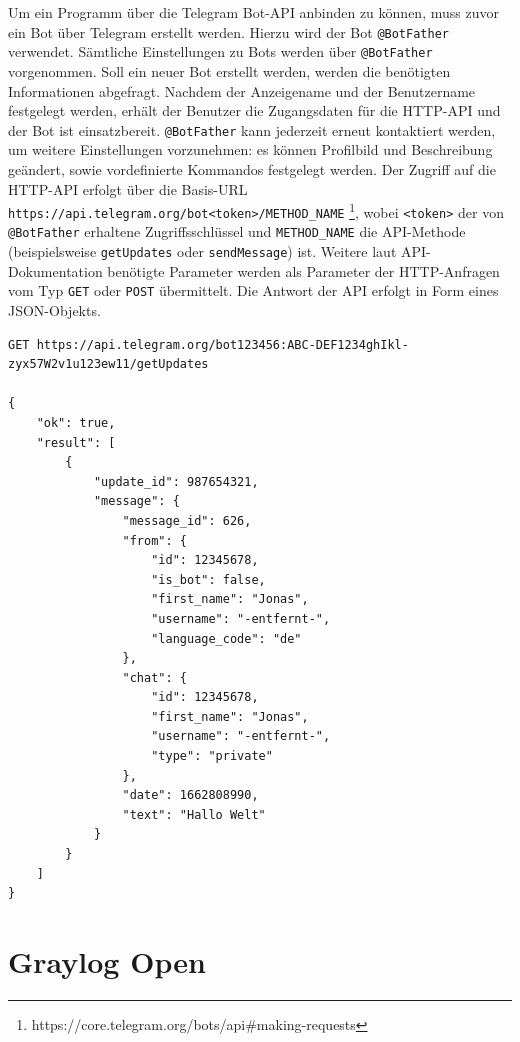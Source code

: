 Um ein Programm über die Telegram Bot-API anbinden zu können, muss zuvor ein Bot über Telegram erstellt werden. Hierzu wird der Bot \lstinline{@BotFather} verwendet. Sämtliche Einstellungen zu Bots werden über \lstinline{@BotFather} vorgenommen. Soll ein neuer Bot erstellt werden, werden die benötigten Informationen abgefragt. Nachdem der Anzeigename und der Benutzername festgelegt werden, erhält der Benutzer die Zugangsdaten für die HTTP-API und der Bot ist einsatzbereit. \lstinline{@BotFather} kann jederzeit erneut kontaktiert werden, um weitere Einstellungen vorzunehmen: es können Profilbild und Beschreibung geändert, sowie vordefinierte Kommandos festgelegt werden. Der Zugriff auf die HTTP-API erfolgt über die Basis-URL \lstinline{https://api.telegram.org/bot<token>/METHOD_NAME} \footnote{https://core.telegram.org/bots/api\#making-requests}, wobei \lstinline{<token>} der von \lstinline{@BotFather} erhaltene Zugriffsschlüssel und \lstinline{METHOD_NAME} die API-Methode (beispielsweise \lstinline{getUpdates} oder \lstinline{sendMessage}) ist. Weitere laut API-Dokumentation benötigte Parameter werden als Parameter der HTTP-Anfragen vom Typ \lstinline{GET} oder \lstinline{POST} übermittelt. Die Antwort der API erfolgt in Form eines JSON-Objekts.

\begin{lstlisting}[caption={Beispiel eines Aufrufs der Telegram HTTP-API. Erhalt einer Textnachricht "Hallo Welt".}, label=lst:bsp-telegram-api, xleftmargin=6mm]
GET https://api.telegram.org/bot123456:ABC-DEF1234ghIkl-zyx57W2v1u123ew11/getUpdates

{
    "ok": true,
    "result": [
        {
            "update_id": 987654321,
            "message": {
                "message_id": 626,
                "from": {
                    "id": 12345678,
                    "is_bot": false,
                    "first_name": "Jonas",
                    "username": "-entfernt-",
                    "language_code": "de"
                },
                "chat": {
                    "id": 12345678,
                    "first_name": "Jonas",
                    "username": "-entfernt-",
                    "type": "private"
                },
                "date": 1662808990,
                "text": "Hallo Welt"
            }
        }
    ]
}
\end{lstlisting}

\section{Graylog Open}

